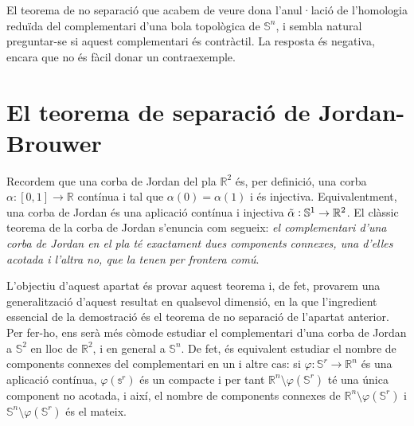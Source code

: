 \documentclass[../main.tex]{subfiles}
\begin{document}
El teorema de no separació que acabem de veure dona l'anul·lació de l'homologia reduïda del complementari d'una bola topològica de $\mathbb{S}^n$, i sembla natural preguntar-se si aquest complementari és contràctil. La resposta és negativa, encara que no és fàcil donar un contraexemple.

\section{El teorema de separació de Jordan-Brouwer}

Recordem que una corba de Jordan del pla $\mathbb{R}^2$ és, per definició, una corba $\alpha:[0,1]\rightarrow \mathbb{R}$ contínua i tal que $\alpha(0) = \alpha(1)$ i és injectiva. Equivalentment, una corba de Jordan és una aplicació contínua i injectiva $\Tilde{\alpha}:\mathbb{S}^1\rightarrow\mathbb{R}^2$. El clàssic teorema de la corba de Jordan s'enuncia com segueix: \textit{el complementari d'una corba de Jordan en el pla té exactament dues components connexes, una d'elles acotada i l'altra no, que la tenen per frontera comú}. 

L'objectiu d'aquest apartat és provar aquest teorema i, de fet, provarem una generalització d'aquest resultat en qualsevol dimensió, en la que l'ingredient essencial de la demostració és el teorema de no separació de l'apartat anterior. Per fer-ho, ens serà més còmode estudiar el complementari d'una corba de Jordan a $\mathbb{S}^2$ en lloc de $\mathbb{R}^2$, i en general a $\mathbb{S}^n$. De fet, és equivalent estudiar el nombre de components connexes del complementari en un i altre cas: si $\varphi:\mathbb{S}^r\rightarrow\mathbb{R}^n$ és una aplicació contínua, $\varphi(\mathbb{s}^r)$ és un compacte i per tant $\mathbb{R}^n\setminus\varphi(\mathbb{S}^r)$ té una única component no acotada, i així, el nombre de components connexes de $\mathbb{R}^n\setminus\varphi(\mathbb{S}^r)$ i $\mathbb{S}^n\setminus\varphi(\mathbb{S}^r)$ és el mateix.
\end{document}
